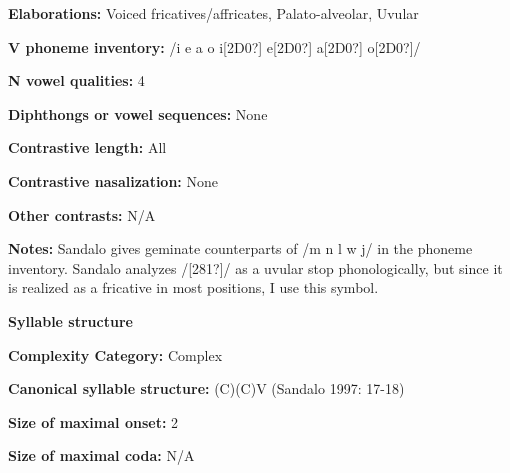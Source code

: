 \begin{styleBody}
\textbf{Elaborations:} Voiced fricatives/affricates, Palato-alveolar, Uvular
\end{styleBody}

\begin{styleBody}
\textbf{V phoneme inventory:} /i e a o i[2D0?] e[2D0?] a[2D0?] o[2D0?]/
\end{styleBody}

\begin{styleBody}
\textbf{N vowel qualities:} 4
\end{styleBody}

\begin{styleBody}
\textbf{Diphthongs or vowel sequences:} None
\end{styleBody}

\begin{styleBody}
\textbf{Contrastive length:} All
\end{styleBody}

\begin{styleBody}
\textbf{Contrastive nasalization:} None
\end{styleBody}

\begin{styleBody}
\textbf{Other contrasts:} N/A
\end{styleBody}

\begin{styleBody}
\textbf{Notes:} Sandalo gives geminate counterparts of /m n l w j/ in the phoneme inventory. Sandalo analyzes /[281?]/ as a uvular stop phonologically, but since it is realized as a fricative in most positions, I use this symbol.
\end{styleBody}

\begin{styleBody}
\textbf{Syllable structure}
\end{styleBody}

\begin{styleBody}
\textbf{Complexity Category:} Complex
\end{styleBody}

\begin{styleBody}
\textbf{Canonical syllable structure:} (C)(C)V\textbf{ }(Sandalo 1997: 17-18)
\end{styleBody}

\begin{styleBody}
\textbf{Size of maximal onset:} 2
\end{styleBody}

\begin{styleBody}
\textbf{Size of maximal coda:} N/A
\end{styleBody}

